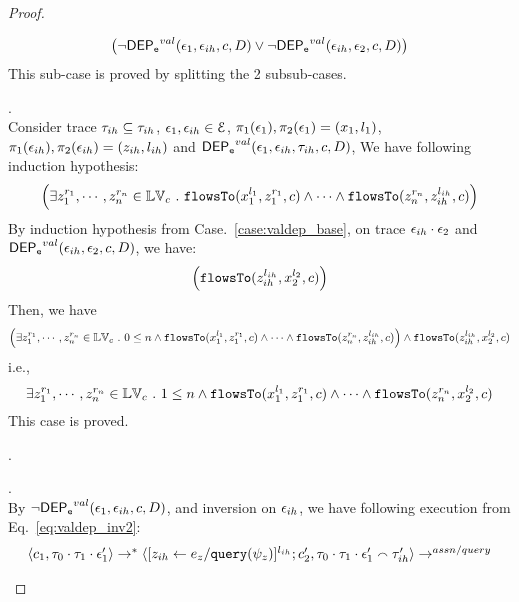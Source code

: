 \begin{proof}
\begin{case}
\begin{subcase}
\[\big(\neg \mathsf{DEP_{\mathtt{e}}}^{val}(\mathtt{\epsilon}_1, \mathtt{\epsilon}_{ih}, c, D) 
\lor \neg \mathsf{DEP_{\mathtt{e}}}^{val}(\mathtt{\epsilon}_{ih}, \mathtt{\epsilon}_2, c, D)\big)
\]
%
This sub-case is proved by splitting the 2 subsub-cases.
%
\begin{subsubcase}
\label{case:valdep_ihasndep}.
\\
Consider trace $\mathtt{\tau}_{ih} \subseteq \mathtt{\tau}_{ih}$,  $\mathtt{\epsilon}_1, \mathtt{\epsilon}_{ih} \in \mathcal{E}$, 
$\pi_1(\mathtt{\epsilon}_1), \pi_2(\mathtt{\epsilon}_1) = (x_1, l_1)$, $\pi_1(\mathtt{\epsilon}_{ih}), \pi_2(\mathtt{\epsilon}_{ih}) = (z_{ih}, l_{ih})$ and
$\mathsf{DEP_{\mathtt{e}}}^{val}(\mathtt{\epsilon}_1, \mathtt{\epsilon}_{ih}, \mathtt{\tau}_{ih}, c,D)$, 
We have following induction hypothesis:
%
\[
\Big(\exists z_1^{r_1}, \cdots, z_n^{r_n} \in \mathbb{LV}_{{c}} ~.~ \mathtt{flowsTo}(x_1^{l_1}, z_1^{r_1}, c) \land \cdots \land \mathtt{flowsTo}(z_n^{r_n}, z_{ih}^{l_{ih}}, c) \Big)
\]
%
By induction hypothesis from Case.~\ref{case:valdep_base}, on trace $\mathtt{\epsilon}_{ih} \cdot \mathtt{\epsilon}_2$ and $\mathsf{DEP_{\mathtt{e}}}^{val}(\mathtt{\epsilon}_{ih}, \mathtt{\epsilon}_2, c, D)$,
we have:
\[
\Big( \mathtt{flowsTo}(z_{ih}^{l_{ih}}, {x}_2^{l_2}, c) \Big)
\]
%
Then, we have
%
\[
\Big(\exists z_1^{r_1}, \cdots, z_n^{r_n} \in \mathbb{LV}_{{c}} ~.~  0 \leq n \land
 \mathtt{flowsTo}(x_1^{l_1}, z_1^{r_1}, c) \land \cdots \land \mathtt{flowsTo}(z_n^{r_n}, z_{ih}^{l_{ih}}, c)
  \Big)\land \mathtt{flowsTo}(z_{ih}^{l_{ih}}, {x}_2^{l_2}, c)
\]
%
i.e.,
\[
\exists z_1^{r_1}, \cdots, z_n^{r_n} \in \mathbb{LV}_{{c}} ~.~ 1 \leq n \land \mathtt{flowsTo}(x_1^{l_1}, z_1^{r_1}, c) \land \cdots 
\land \mathtt{flowsTo}(z_n^{r_n}, {x}_2^{l_2}, c)
\]
%
This case is proved.
\end{subsubcase}
%
\begin{subsubcase}.
%
\begin{subsubsubcase}.
\\
By $\neg \mathsf{DEP_{\mathtt{e}}}^{val}(\mathtt{\epsilon}_1, \mathtt{\epsilon}_{ih}, c, D)$, and inversion on $\mathtt{\epsilon}_{ih}$, we have following execution from Eq.~\ref{eq:valdep_inv2}:
\begin{equation}
\label{eq:m1asn_inv2}
  \begin{array}{l}   
  \langle c_1, \mathtt{\tau}_0 \cdot \mathtt{\tau}_1 \cdot \mathtt{\epsilon}_1' \rangle 
  \rightarrow^{*} 
  \langle [\mathrel{ z_{ih} \leftarrow e_z / {\tt query}(\psi_z) }]^{l_{ih}};{c}_2', 
  \mathtt{\tau}_0 \cdot \mathtt{\tau}_1 \cdot \mathtt{\epsilon}_1' \smallfrown \mathtt{\tau}_{ih}' \rangle 
  \rightarrow^{assn/query} 

\end{array}
\end{equation}
\end{subsubsubcase}
\end{subsubcase}
\end{subcase}
\end{case}
\end{proof}
